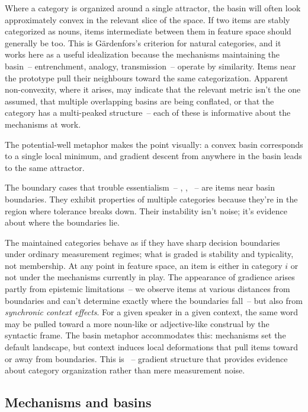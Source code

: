 Where a category is organized around a single attractor, the basin will often look approximately convex in the relevant slice of the space. If two items are stably categorized as nouns, items intermediate between them in feature space should generally be too. This is Gärdenfors's criterion for natural categories, and it works here as a useful idealization because the mechanisms maintaining the basin~-- entrenchment, analogy, transmission~-- operate by similarity. Items near the prototype pull their neighbours toward the same categorization. Apparent non-convexity, where it arises, may indicate that the relevant metric isn't the one assumed, that multiple overlapping basins are being conflated, or that the category has a multi-peaked structure~-- each of these is informative about the mechanisms at work.

The potential-well metaphor makes the point visually: a convex basin corresponds to a single local minimum, and gradient descent from anywhere in the basin leads to the same attractor.

The boundary cases that trouble essentialism~-- , , ~-- are items near basin boundaries. They exhibit properties of multiple categories because they're in the region where tolerance breaks down. Their instability isn't noise; it's evidence about where the boundaries lie.

The maintained categories behave as if they have sharp decision boundaries under ordinary measurement regimes; what is graded is stability and typicality, not membership. At any point in feature space, an item is either in category $i$ or not under the mechanisms currently in play. The appearance of gradience arises partly from epistemic limitations~-- we observe items at various distances from boundaries and can't determine exactly where the boundaries fall~-- but also from \emph{synchronic context effects}. For a given speaker in a given context, the same word may be pulled toward a more noun-like or adjective-like construal by the syntactic frame. The basin metaphor accommodates this: mechanisms set the default landscape, but context induces local deformations that pull items toward or away from boundaries. This is ~-- gradient structure that provides evidence about category organization rather than mere measurement noise.

\subsection{Mechanisms and basins}
\label{subsec:5:mechanisms-basins}

